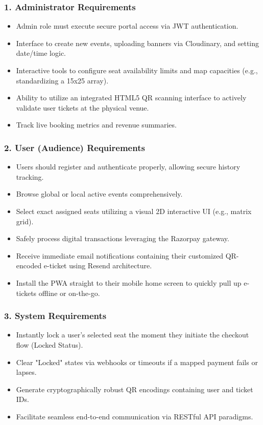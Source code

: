 \documentclass[12pt,a4paper]{report}
\begin{document}
\subsubsection*{1. Administrator Requirements}
\begin{itemize}
    \item Admin role must execute secure portal access via JWT authentication.
    \item Interface to create new events, uploading banners via Cloudinary, and setting date/time logic.
    \item Interactive tools to configure seat availability limits and map capacities (e.g., standardizing a 15x25 array).
    \item Ability to utilize an integrated HTML5 QR scanning interface to actively validate user tickets at the physical venue.
    \item Track live booking metrics and revenue summaries.
\end{itemize}

\subsubsection*{2. User (Audience) Requirements}
\begin{itemize}
    \item Users should register and authenticate properly, allowing secure history tracking.
    \item Browse global or local active events comprehensively.
    \item Select exact assigned seats utilizing a visual 2D interactive UI (e.g., matrix grid).
    \item Safely process digital transactions leveraging the Razorpay gateway.
    \item Receive immediate email notifications containing their customized QR-encoded e-ticket using Resend architecture.
    \item Install the PWA straight to their mobile home screen to quickly pull up e-tickets offline or on-the-go.
\end{itemize}

\subsubsection*{3. System Requirements}
\begin{itemize}
    \item Instantly lock a user's selected seat the moment they initiate the checkout flow (Locked Status).
    \item Clear "Locked" states via webhooks or timeouts if a mapped payment fails or lapses.
    \item Generate cryptographically robust QR encodings containing user and ticket IDs.
    \item Facilitate seamless end-to-end communication via RESTful API paradigms.
\end{itemize}
\end{document}
